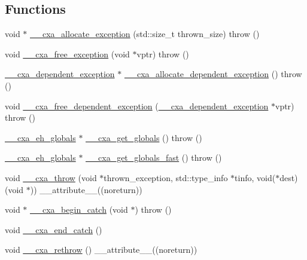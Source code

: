 \subsection*{Functions}
\begin{DoxyCompactItemize}
\item 
void $\ast$ \hyperlink{namespace____cxxabiv1_a1bf118309de45a604f6e68d5a30b110a}{\-\_\-\-\_\-cxa\-\_\-allocate\-\_\-exception} (std\-::size\-\_\-t thrown\-\_\-size)  throw ()
\item 
void \hyperlink{namespace____cxxabiv1_a39c21cf41e5c2b153858f295e0c007e2}{\-\_\-\-\_\-cxa\-\_\-free\-\_\-exception} (void $\ast$vptr)  throw ()
\item 
\hyperlink{struct____cxxabiv1_1_1____cxa__dependent__exception}{\-\_\-\-\_\-cxa\-\_\-dependent\-\_\-exception} $\ast$ \hyperlink{namespace____cxxabiv1_acf05beb6b38df0079e2baba52f71d799}{\-\_\-\-\_\-cxa\-\_\-allocate\-\_\-dependent\-\_\-exception} ()  throw ()
\item 
void \hyperlink{namespace____cxxabiv1_a67567be05afd0965cfcae2ca22f1d7c9}{\-\_\-\-\_\-cxa\-\_\-free\-\_\-dependent\-\_\-exception} (\hyperlink{struct____cxxabiv1_1_1____cxa__dependent__exception}{\-\_\-\-\_\-cxa\-\_\-dependent\-\_\-exception} $\ast$vptr)  throw ()
\item 
\hyperlink{struct____cxxabiv1_1_1____cxa__eh__globals}{\-\_\-\-\_\-cxa\-\_\-eh\-\_\-globals} $\ast$ \hyperlink{namespace____cxxabiv1_a4bf3c8fb770500c0ef4e3982856c9196}{\-\_\-\-\_\-cxa\-\_\-get\-\_\-globals} ()  throw ()
\item 
\hyperlink{struct____cxxabiv1_1_1____cxa__eh__globals}{\-\_\-\-\_\-cxa\-\_\-eh\-\_\-globals} $\ast$ \hyperlink{namespace____cxxabiv1_a8f410bff4c6156ad943edda57b60a2ba}{\-\_\-\-\_\-cxa\-\_\-get\-\_\-globals\-\_\-fast} ()  throw ()
\item 
void \hyperlink{namespace____cxxabiv1_a301675c046ac023f33820493fac3e592}{\-\_\-\-\_\-cxa\-\_\-throw} (void $\ast$thrown\-\_\-exception, std\-::type\-\_\-info $\ast$tinfo, void($\ast$dest)(void $\ast$)) \-\_\-\-\_\-attribute\-\_\-\-\_\-((noreturn))
\item 
void $\ast$ \hyperlink{namespace____cxxabiv1_a4169d9dfe292e8011c8b7c36b0c1a010}{\-\_\-\-\_\-cxa\-\_\-begin\-\_\-catch} (void $\ast$)  throw ()
\item 
void \hyperlink{namespace____cxxabiv1_a770a73f25be21598aa6aa1aa8f2ba5e5}{\-\_\-\-\_\-cxa\-\_\-end\-\_\-catch} ()
\item 
void \hyperlink{namespace____cxxabiv1_a02474e3a539df52d3cb0dae1f50b7a35}{\-\_\-\-\_\-cxa\-\_\-rethrow} () \-\_\-\-\_\-attribute\-\_\-\-\_\-((noreturn))

\end{DoxyCompactItemize}
